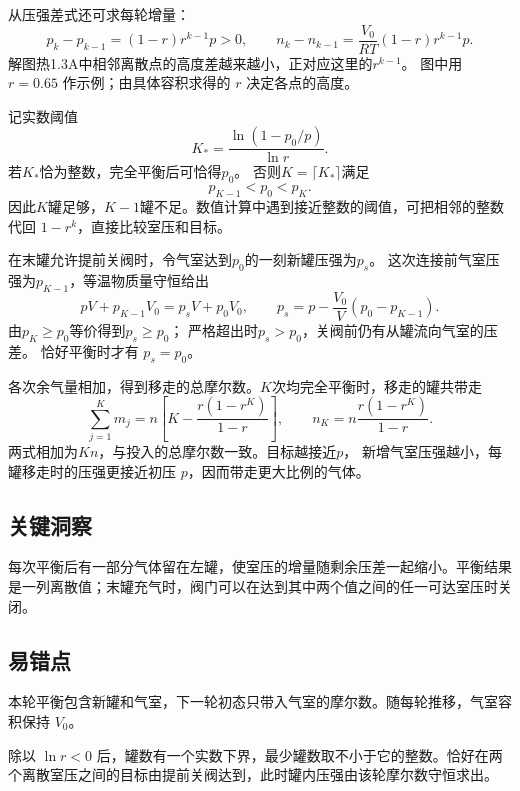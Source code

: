 \documentclass[UTF8,fontset=fandol,a4paper,11pt]{ctexart}
\begin{document}
从压强差式还可求每轮增量：
\[
p_k-p_{k-1}=(1-r)r^{k-1}p>0,\qquad
n_k-n_{k-1}=\frac{V_0}{RT}(1-r)r^{k-1}p.
\]
解图热1.3A中相邻离散点的高度差越来越小，正对应这里的$r^{k-1}$。
图中用 $r=0.65$ 作示例；由具体容积求得的 $r$ 决定各点的高度。

记实数阈值
\[
K_*=\frac{\ln(1-p_0/p)}{\ln r}.
\]
若$K_*$恰为整数，完全平衡后可恰得$p_0$。
否则$K=\lceil K_*\rceil$满足
\[
p_{K-1}<p_0<p_K.
\]
因此$K$罐足够，$K-1$罐不足。数值计算中遇到接近整数的阈值，可把相邻的整数代回 $1-r^k$，直接比较室压和目标。

在末罐允许提前关阀时，令气室达到$p_0$的一刻新罐压强为$p_s$。
这次连接前气室压强为$p_{K-1}$，等温物质量守恒给出
\[
pV+p_{K-1}V_0=p_sV+p_0V_0,\qquad
p_s=p-\frac{V_0}{V}(p_0-p_{K-1}).
\]
由$p_K\ge p_0$等价得到$p_s\ge p_0$；
严格超出时$p_s>p_0$，关阀前仍有从罐流向气室的压差。
恰好平衡时才有 $p_s=p_0$。

各次余气量相加，得到移走的总摩尔数。$K$次均完全平衡时，移走的罐共带走
\[
\sum_{j=1}^K m_j
=n\left[K-\frac{r(1-r^K)}{1-r}\right],
\qquad
n_K=n\frac{r(1-r^K)}{1-r}.
\]
两式相加为$Kn$，与投入的总摩尔数一致。目标越接近$p$，
新增气室压强越小，每罐移走时的压强更接近初压 $p$，因而带走更大比例的气体。




\subsection*{关键洞察}

每次平衡后有一部分气体留在左罐，使室压的增量随剩余压差一起缩小。平衡结果是一列离散值；末罐充气时，阀门可以在达到其中两个值之间的任一可达室压时关闭。



\subsection*{易错点}

本轮平衡包含新罐和气室，下一轮初态只带入气室的摩尔数。随每轮推移，气室容积保持 $V_0$。

除以 $\ln r<0$ 后，罐数有一个实数下界，最少罐数取不小于它的整数。恰好在两个离散室压之间的目标由提前关阀达到，此时罐内压强由该轮摩尔数守恒求出。


\end{document}
